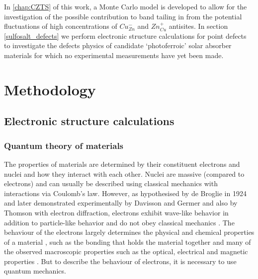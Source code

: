 \documentclass[11pt, twoside]{report}
\begin{document}
In \autoref{chap:CZTS} of this work, a Monte Carlo model is developed to allow for the investigation of the possible contribution to band tailing in {\CZTS} from the potential fluctuations of high concentrations of $Cu_{Zn}^{-}$ and $Zn_{Cu}^{+}$ antisites. In section \ref{sulfosalt_defects} we perform electronic structure calculations for point defects to investigate the defects physics of candidate `photoferroic' solar absorber materials for which no experimental measurements have yet been made.



\chapter{Methodology}

\section{Electronic structure calculations}\label{elec_struc}

\subsection{Quantum theory of materials}


The properties of materials are determined by their constituent electrons and nuclei and how they interact with each other. Nuclei are massive (compared to electrons) and can usually be described using classical mechanics with interactions via Coulomb's law. However, as hypothesised by de Broglie in 1924 and later demonstrated experimentally by Davisson and Germer and also by Thomson with electron diffraction, electrons exhibit wave-like behavior in addition to particle-like behavior and do not obey classical mechanics \cite{quantum_intro}. The behaviour of the electrons largely determines the physical and chemical properties of a material \cite{Prasad_ch2}, such as the bonding that holds the material together and many of the observed macroscopic properties such as the optical, electrical and magnetic properties \cite{RichardMartin_Ch1}. But to describe the behaviour of electrons, it is necessary to use quantum mechanics.
\end{document}
